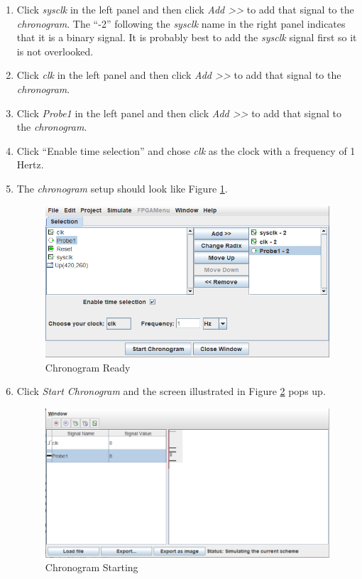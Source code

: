 \begin{enumerate}
	\item Click \textit{sysclk} in the left panel and then click \textit{Add >>} to add that signal to the \textit{chronogram}. The ``-2'' following the \textit{sysclk} name in the right panel indicates that it is a binary signal. It is probably best to add the \textit{sysclk} signal first so it is not overlooked.
	\item Click \textit{clk} in the left panel and then click \textit{Add >>} to add that signal to the \textit{chronogram}.
	\item Click \textit{Probe1} in the left panel and then click \textit{Add >>} to add that signal to the \textit{chronogram}.
	\item Click ``Enable time selection'' and chose \textit{clk} as the clock with a frequency of 1 Hertz.
	\item The \textit{chronogram} setup should look like Figure \ref{fig:06-09}.
	
	\begin{figure}[H]
		\centering
		\includegraphics[width=\maxwidth{.95\linewidth}]{gfx/06-09}
		\caption{Chronogram Ready}
		\label{fig:06-09}
	\end{figure}

	\item Click \textit{Start Chronogram} and the screen illustrated in Figure \ref{fig:06-10} pops up.
	
	\begin{figure}[H]
		\centering
		\includegraphics[width=\maxwidth{.95\linewidth}]{gfx/06-10}
		\caption{Chronogram Starting}
		\label{fig:06-10}
	\end{figure}
	

\end{enumerate}
